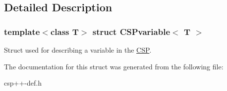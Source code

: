 \subsection{Detailed Description}
\subsubsection*{template$<$class T$>$ struct CSPvariable$<$ T $>$}

Struct used for describing a variable in the \hyperlink{classCSP}{CSP}. 

The documentation for this struct was generated from the following file:\begin{DoxyCompactItemize}
\item 
csp++-\/def.h\end{DoxyCompactItemize}
